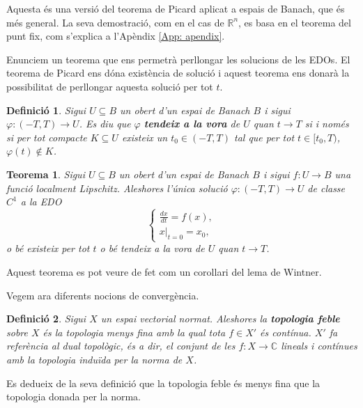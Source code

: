 \documentclass{article}
\numberwithin{equation}{section}
\newtheorem{teorema}{Teorema}[section]
\newtheorem{definicio}{Definici\'{o}}[section]
\begin{document}
Aquesta \'{e}s una versi\'{o} del teorema de Picard aplicat a espais de Banach, que \'{e}s m\'{e}s general. La seva demostraci\'{o}, com en el cas de $\mathbb{R}^n$, es basa en el teorema del punt fix, com s'explica a l'Ap\`{e}ndix \ref{App: apendix}.

Enunciem un teorema que ens permetr\`{a} perllongar les solucions de les EDOs. El teorema de Picard ens d\'{o}na exist\`{e}ncia de soluci\'{o} i aquest teorema ens donar\`{a} la possibilitat de perllongar aquesta soluci\'{o} per tot $t$.

\begin{definicio}
Sigui $U\subseteq B$ un obert d'un espai de Banach $B$ i sigui $\varphi:(-T,T)\rightarrow U$. Es diu que $\varphi$ \textbf{tendeix a la vora} de $U$ quan $t\to T$ si i nom\'{e}s si per tot compacte $K\subseteq U$ existeix un $t_0\in(-T,T)$ tal que per tot $t\in[t_0,T)$, $\varphi(t)\notin K$.
\end{definicio}

\begin{teorema}\label{Teo: Wintner}
Sigui $U\subseteq B$ un obert d'un espai de Banach $B$ i sigui $f:U\rightarrow B$ una funci\'{o} localment Lipschitz. Aleshores l'\'{u}nica soluci\'{o} $\varphi:(-T,T)\rightarrow U$ de classe $C^1$ a la EDO
\[\left\{\begin{array}{l}\displaystyle{\frac{dx}{dt}=f(x),}\\x|_{t=0}=x_0,\end{array}\right.\]
o b\'{e} existeix per tot $t$ o b\'{e} tendeix a la vora de $U$ quan $t\to T$.
\end{teorema}

Aquest teorema es pot veure de fet com un corol\textperiodcentered lari del lema de Wintner.
\vspace{3mm}

Vegem ara diferents nocions de converg\`{e}ncia.

\begin{definicio}
Sigui $X$ un espai vectorial normat. Aleshores la \textbf{topologia feble} sobre $X$ \'{e}s la topologia menys fina amb la qual tota $f\in X'$ \'{e}s cont\'{i}nua. $X'$ fa refer\`{e}ncia al dual topol\`{o}gic, \'{e}s a dir, el conjunt de les $f:X\rightarrow\mathbb{C}$ lineals i cont\'{i}nues amb la topologia indu\"{i}da per la norma de $X$.
\end{definicio}

Es dedueix de la seva definici\'{o} que la topologia feble \'{e}s menys fina que la topologia donada per la norma.
\end{document}
